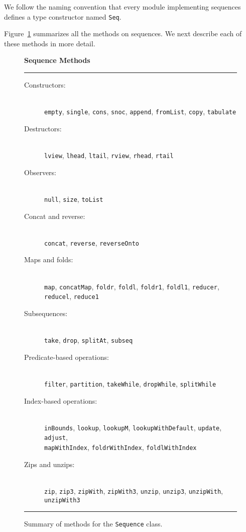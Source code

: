 \documentclass{report}
\newcommand{\cd}{\texttt}
\newcommand{\Figure}[1]{Figure~\ref{#1}}
\newcommand{\nl}{\hspace*{0pt}\\}
\begin{document}
We follow the naming convention that every module implementing sequences
defines a type constructor named \cd{Seq}.

\Figure{seq-methods} summarizes all the methods on sequences.  We next
describe each of these methods in more detail.

\begin{figure}
\begin{center}
\large\bfseries Sequence Methods
\end{center}
\hrule
\begin{description}
\item[Constructors:] \nl
    \cd{empty}, \cd{single}, \cd{cons}, \cd{snoc}, \cd{append}, \cd{fromList}, \cd{copy}, \cd{tabulate}

\item[Destructors:] \nl
    \cd{lview}, \cd{lhead}, \cd{ltail}, \cd{rview}, \cd{rhead}, \cd{rtail}

\item[Observers:] \nl
    \cd{null}, \cd{size}, \cd{toList}

\item[Concat and reverse:] \nl
    \cd{concat}, \cd{reverse}, \cd{reverseOnto}

\item[Maps and folds:] \nl
    \cd{map}, \cd{concatMap}, \cd{foldr}, \cd{foldl}, \cd{foldr1}, \cd{foldl1}, \cd{reducer}, \cd{reducel}, \cd{reduce1}

\item[Subsequences:] \nl
    \cd{take}, \cd{drop}, \cd{splitAt}, \cd{subseq}

\item[Predicate-based operations:] \nl
    \cd{filter}, \cd{partition}, \cd{takeWhile}, \cd{dropWhile}, \cd{splitWhile}

\item[Index-based operations:] \nl
    \cd{inBounds}, \cd{lookup}, \cd{lookupM}, \cd{lookupWithDefault}, \cd{update}, \cd{adjust}, \\
    \cd{mapWithIndex}, \cd{foldrWithIndex}, \cd{foldlWithIndex}

\item[Zips and unzips:] \nl
    \cd{zip}, \cd{zip3}, \cd{zipWith}, \cd{zipWith3}, \cd{unzip}, \cd{unzip3}, \cd{unzipWith}, \cd{unzipWith3}
\end{description}
\hrule
\caption{Summary of methods for the \cd{Sequence} class.}
\label{seq-methods}
\end{figure}
\end{document}
